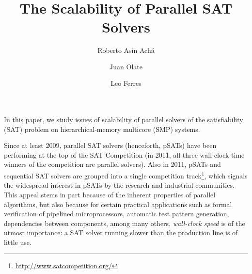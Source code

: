 \documentclass{llncs}
\begin{document}


\newcommand{\pling}{{\tt plingeling}}
\newcommand{\barc}{Barelogic$^S$}
\title{The Scalability of Parallel SAT Solvers}

\author{Roberto As\'in Ach\'a \and Juan Olate  \and Leo Ferres }


\maketitle

In this paper, we study issues of scalability of parallel solvers of
the satisfiability (SAT) problem on hierarchical-memory multicore
(SMP) systems.

Since at least 2009, parallel SAT solvers (henceforth, pSATs) have
been performing at the top of the SAT Competition (in 2011, all three
wall-clock time winners of the competition are parallel solvers).
Also in 2011, pSATs and sequential SAT solvers are grouped into a
single competition
track\footnote{\url{http://www.satcompetition.org/}}, which signals
the widespread interest in pSATs by the research and industrial
communities. This appeal stems in part because of the inherent
properties of parallel algorithms, but also because for certain
practical applications such as formal verification of pipelined
microprocessors, automatic test pattern generation, dependencies
between components, among many others, {\em wall-clock speed} is of
the utmost importance: a SAT solver running slower than the production
line is of little use.
\end{document}
